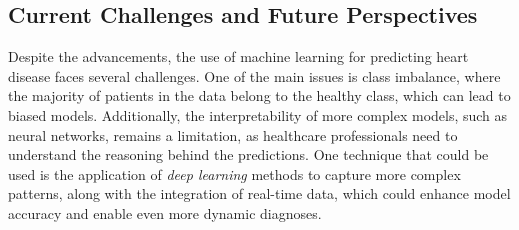 \subsection{Current Challenges and Future Perspectives}
Despite the advancements, the use of machine learning for predicting heart disease faces several challenges. One of the main issues is class imbalance, where the majority of patients in the data belong to the healthy class, which can lead to biased models. Additionally, the interpretability of more complex models, such as neural networks, remains a limitation, as healthcare professionals need to understand the reasoning behind the predictions. One technique that could be used is the application of \textit{deep learning} methods to capture more complex patterns, along with the integration of real-time data, which could enhance model accuracy and enable even more dynamic diagnoses.